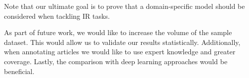 \documentclass[10pt, a4paper]{article}
\begin{document}
	Note that our ultimate goal is to prove that a domain-specific model should be considered when tackling IR tasks.

	As part of future work, we would like to increase the volume of the sample dataset. This would allow us to validate our results statistically. Additionally, when annotating articles we would like to use expert knowledge and greater coverage. Lastly, the comparison with deep learning approaches would be beneficial.




\end{document}

